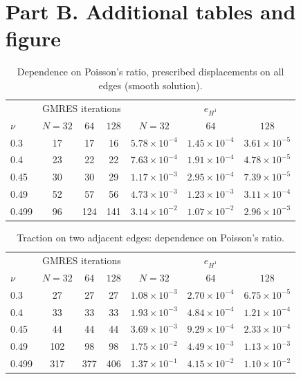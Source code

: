 \documentclass[11pt]{article}
\begin{document}
\clearpage
\section*{Part B. Additional tables and figure}
\begin{table}[htbp]\centering\small
\caption{Dependence on Poisson's ratio, prescribed displacements on all edges (smooth solution).}
\begin{tabular}{l ccc ccc}
\toprule
& \multicolumn{3}{c}{GMRES iterations} & \multicolumn{3}{c}{$e_{H^1}$}\\
$\nu$ & $N=32$ & $64$ & $128$ & $N=32$ & $64$ & $128$\\
\midrule
0.3 & 17 & 17 & 16 & $5.78{\times}10^{-4}$ & $1.45{\times}10^{-4}$ & $3.61{\times}10^{-5}$\\
0.4 & 23 & 22 & 22 & $7.63{\times}10^{-4}$ & $1.91{\times}10^{-4}$ & $4.78{\times}10^{-5}$\\
0.45 & 30 & 30 & 29 & $1.17{\times}10^{-3}$ & $2.95{\times}10^{-4}$ & $7.39{\times}10^{-5}$\\
0.49 & 52 & 57 & 56 & $4.73{\times}10^{-3}$ & $1.23{\times}10^{-3}$ & $3.11{\times}10^{-4}$\\
0.499 & 96 & 124 & 141 & $3.14{\times}10^{-2}$ & $1.07{\times}10^{-2}$ & $2.96{\times}10^{-3}$\\
\bottomrule
\end{tabular}
\end{table}

\begin{table}[htbp]\centering\small
\caption{Traction on two adjacent edges: dependence on Poisson's ratio.}
\begin{tabular}{l ccc ccc}
\toprule
& \multicolumn{3}{c}{GMRES iterations} & \multicolumn{3}{c}{$e_{H^1}$}\\
$\nu$ & $N=32$ & $64$ & $128$ & $N=32$ & $64$ & $128$\\
\midrule
0.3 & 27 & 27 & 27 & $1.08{\times}10^{-3}$ & $2.70{\times}10^{-4}$ & $6.75{\times}10^{-5}$\\
0.4 & 33 & 33 & 33 & $1.93{\times}10^{-3}$ & $4.84{\times}10^{-4}$ & $1.21{\times}10^{-4}$\\
0.45 & 44 & 44 & 44 & $3.69{\times}10^{-3}$ & $9.29{\times}10^{-4}$ & $2.33{\times}10^{-4}$\\
0.49 & 102 & 98 & 98 & $1.75{\times}10^{-2}$ & $4.49{\times}10^{-3}$ & $1.13{\times}10^{-3}$\\
0.499 & 317 & 377 & 406 & $1.37{\times}10^{-1}$ & $4.15{\times}10^{-2}$ & $1.10{\times}10^{-2}$\\
\bottomrule
\end{tabular}
\end{table}
\end{document}
